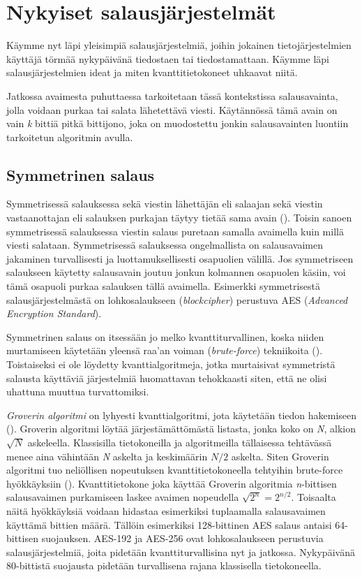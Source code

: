 \chapter{Nykyiset salausjärjestelmät\label{methods}}

Käymme nyt läpi yleisimpiä salausjärjestelmiä, joihin jokainen tietojärjestelmien käyttäjä törmää nykypäivänä tiedostaen tai tiedostamattaan. Käymme läpi salausjärjestelmien ideat ja miten kvanttitietokoneet uhkaavat niitä.

Jatkossa avaimesta puhuttaessa tarkoitetaan tässä kontekstissa salausavainta, jolla voidaan purkaa tai salata lähetettävä viesti. Käytännössä tämä avain on vain \emph{k} bittiä pitkä bittijono, joka on muodostettu jonkin salausavainten luontiin tarkoitetun algoritmin avulla.

\section{Symmetrinen salaus}
 Symmetrisessä salauksessa sekä viestin lähettäjän eli salaajan sekä viestin vastaanottajan eli salauksen purkajan täytyy tietää sama avain (\cite{bellare2005introduction}). Toisin sanoen symmetrisessä salauksessa viestin salaus puretaan samalla avaimella kuin millä viesti salataan.  Symmetrisessä salauksessa ongelmallista on salausavaimen jakaminen turvallisesti ja luottamuksellisesti osapuolien välillä. Jos symmetriseen salaukseen käytetty salausavain joutuu jonkun kolmannen osapuolen käsiin, voi tämä osapuoli purkaa salauksen tällä avaimella. Esimerkki symmetrisestä salausjärjestelmästä on lohkosalaukseen (\emph{blockcipher}) perustuva AES (\emph{Advanced Encryption Standard}).
 
 Symmetrinen salaus on itsessään jo melko kvanttiturvallinen, koska niiden murtamiseen käytetään yleensä raa'an voiman (\emph{brute-force}) tekniikoita (\cite{mavroeidis2018impact}). Toistaiseksi ei ole löydetty kvanttialgoritmeja, jotka murtaisivat symmetristä salausta käyttäviä järjestelmiä huomattavan tehokkaasti siten, että ne olisi uhattuna muuttua turvattomiksi. 
 
 \emph{Groverin algoritmi} on lyhyesti kvanttialgoritmi, jota käytetään tiedon hakemiseen (\cite{hayward2008quantum}). Groverin algoritmi löytää järjestämättömästä listasta, jonka koko on \emph{N}, alkion $\sqrt{N}$ askeleella. Klassisilla tietokoneilla ja algoritmeilla tällaisessa tehtävässä menee aina vähintään \emph{N} askelta ja keskimäärin $N/2$ askelta. Siten Groverin algoritmi tuo neliöllisen nopeutuksen kvanttitietokoneella tehtyihin brute-force hyökkäyksiin (\cite{mavroeidis2018impact}). Kvanttitietokone joka käyttää Groverin algoritmia \emph{n}-bittisen salausavaimen purkamiseen laskee avaimen nopeudella $\sqrt{2^{n}} = 2^{n/2}$. Toisaalta näitä hyökkäyksiä voidaan hidastaa esimerkiksi tuplaamalla salausavaimen käyttämä bittien määrä. Tällöin esimerkiksi 128-bittinen AES salaus antaisi 64-bittisen suojauksen. AES-192 ja AES-256 ovat lohkosalaukseen perustuvia salausjärjestelmiä, joita pidetään kvanttiturvallisina nyt ja jatkossa. Nykypäivänä 80-bittistä suojausta pidetään turvallisena rajana klassisella tietokoneella.
 
